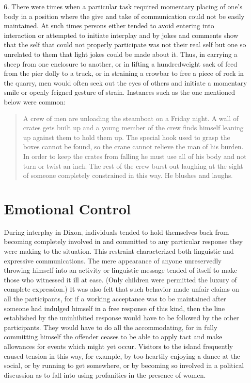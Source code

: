 \documentclass[twoside,symmetric,nobib,justified]{tufte-book}
\begin{document}
6. There were times when a particular task required momentary placing of
one's body in a position where the give and take of communication could
not be easily maintained. At such times persons either tended to avoid
entering into interaction or attempted to initiate interplay and by
jokes and comments show that the self that could not properly
participate was not their real self but one so unrelated to them that
light jokes could be made about it. Thus, in carrying a sheep from one
enclosure to another, or in lifting a hundredweight sack of feed from
the pier dolly to a truck, or in straining a crowbar to free a piece of
rock in the quarry, men would often seek out the eyes of others and
initiate a momentary smile or openly feigned gesture of strain.
Instances such as the one mentioned below were common:

\begin{quote}
A crew of men are unloading the steamboat on a Friday night. A wall of
crates gets built up and a young member of the crew finds himself
leaning up against them to hold them up. The special hook used to grasp
the boxes cannot be found, so the crane cannot relieve the man of his
burden. In order to keep the crates from falling he must use all of his
body and not turn or twist an inch. The rest of the crew burst out
laughing at the sight of someone completely constrained in this way. He
blushes and laughs.
\end{quote}

\hypertarget{emotional-control}{%
\section{Emotional Control}\label{emotional-control}}

During interplay in Dixon, individuals tended to hold themselves back
from becoming completely involved in and committed to any particular
response they were making to the situation. This restraint characterized
both linguistic and expressive communications. The mere appearance of
anyone unreservedly throwing himself into an activity or linguistic
message tended of itself to make those who witnessed it ill at ease.
(Only children were permitted the luxury of complete expression.) It was
also felt that such behavior made unfair claims on all the participants,
for if a working acceptance was to be maintained after someone had
indulged himself in a free response of this kind, then the line
established by the uninhibited response would have to be followed by the
other participants. They would have to do all the accommodating, for in
fully committing himself the offender ceases to be able to apply tact
and make allowances for events which might yet occur. Visitors to the
island frequently caused tension in this way, for example, by too
heartily enjoying a dance at the social, or by running to get somewhere,
or by becoming so involved in a political discussion as to fall into
using profanities in the presence of women.
\end{document}
